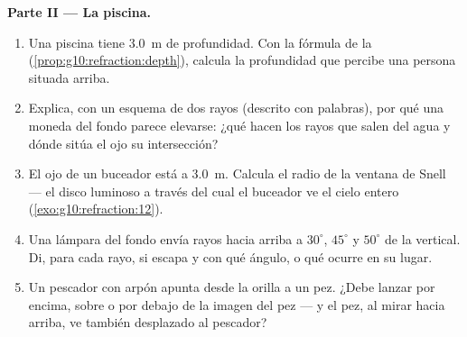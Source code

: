 \begin{problem}
\medskip
\noindent\textbf{Parte II --- La piscina.}
\begin{enumerate}[resume]
  \item Una piscina tiene \qty{3.0}{m} de profundidad. Con la fórmula de
        la 
        (\cref{prop:g10:refraction:depth}), calcula la profundidad que
        percibe una persona situada arriba.
  \item Explica, con un esquema de dos rayos (descrito con palabras),
        por qué una moneda del fondo parece elevarse: ¿qué hacen los
        rayos que salen del agua y dónde sitúa el ojo su intersección?
  \item El ojo de un buceador está a \qty{3.0}{m}. Calcula el radio de
        la ventana de Snell --- el disco luminoso a través del cual el
        buceador ve el cielo entero (\cref{exo:g10:refraction:12}).
  \item Una lámpara del fondo envía rayos hacia arriba a $30^\circ$,
        $45^\circ$ y $50^\circ$ de la vertical. Di, para cada rayo, si
        escapa y con qué ángulo, o qué ocurre en su lugar.
  \item Un pescador con arpón apunta desde la orilla a un pez. ¿Debe
        lanzar por encima, sobre o por debajo de la imagen del pez ---
        y el pez, al mirar hacia arriba, ve también desplazado al
        pescador?
\end{enumerate}


\end{problem}
